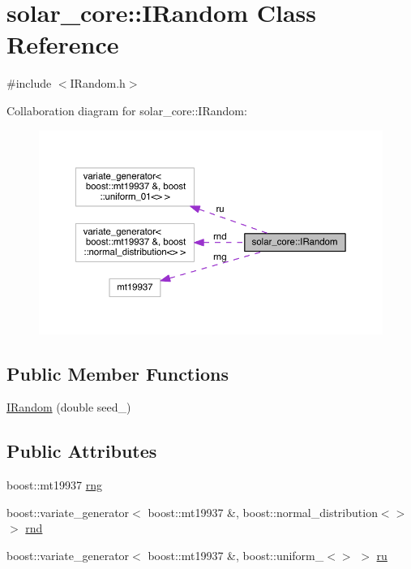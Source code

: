 \hypertarget{classsolar__core_1_1_i_random}{}\section{solar\+\_\+core\+:\+:I\+Random Class Reference}
\label{classsolar__core_1_1_i_random}


{\ttfamily \#include $<$I\+Random.\+h$>$}



Collaboration diagram for solar\+\_\+core\+:\+:I\+Random\+:\nopagebreak
\begin{figure}[H]
\begin{center}
\leavevmode
\includegraphics[width=350pt]{classsolar__core_1_1_i_random__coll__graph}
\end{center}
\end{figure}
\subsection*{Public Member Functions}
\begin{DoxyCompactItemize}
\item 
\hyperlink{classsolar__core_1_1_i_random_a2d9a927aebfdeed274152871f7f66516}{I\+Random} (double seed\+\_\+)
\end{DoxyCompactItemize}
\subsection*{Public Attributes}
\begin{DoxyCompactItemize}
\item 
boost\+::mt19937 \hyperlink{classsolar__core_1_1_i_random_a5d02ddbfd7b3c7a2932166b9ddba5f02}{rng}
\item 
boost\+::variate\+\_\+generator$<$ boost\+::mt19937 \&, boost\+::normal\+\_\+distribution$<$$>$ $>$ \hyperlink{classsolar__core_1_1_i_random_a5a9593271657fe327d1e1ee1b456796c}{rnd}
\item 
boost\+::variate\+\_\+generator$<$ boost\+::mt19937 \&, boost\+::uniform\+\_$<$$>$ $>$ \hyperlink{classsolar__core_1_1_i_random_ab6a4ab724b521abecbcc87cd736edfd2}{ru}
\end{DoxyCompactItemize}



